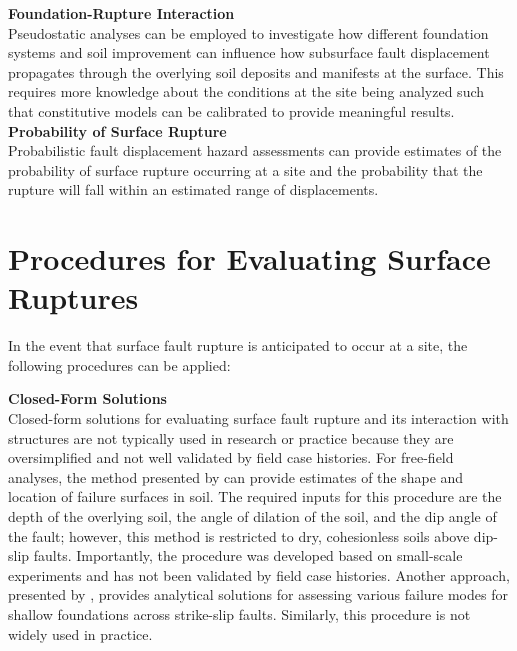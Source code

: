 \noindent\textbf{Foundation-Rupture Interaction}\\
Pseudostatic analyses can be employed to investigate how different foundation systems and soil improvement can influence how subsurface fault displacement propagates through the overlying soil deposits and manifests at the surface. This requires more knowledge about the conditions at the site being analyzed such that constitutive models can be calibrated to provide meaningful results.\\

\noindent\textbf{Probability of Surface Rupture}\\
Probabilistic fault displacement hazard assessments can provide estimates of the probability of surface rupture occurring at a site and the probability that the rupture will fall within an estimated range of displacements.\\

\section{Procedures for Evaluating Surface Ruptures}
\label{sec:eq_surface_rup_procedures}

In the event that surface fault rupture is anticipated to occur at a site, the following procedures can be applied:
\newline

\noindent\textbf{Closed-Form Solutions} \\
Closed-form solutions for evaluating surface fault rupture and its interaction with structures are not typically used in research or practice because they are oversimplified and not well validated by field case histories. For free-field analyses, the method presented by \cite{cole1984influence} can provide estimates of the shape and location of failure surfaces in soil. The required inputs for this procedure are the depth of the overlying soil, the angle of dilation of the soil, and the dip angle of the fault; however, this method is restricted to dry, cohesionless soils above dip-slip faults.  Importantly, the procedure was developed based on small-scale experiments and has not been validated by field case histories. Another approach, presented by \cite{berrill1983twodimensional}, provides analytical solutions for assessing various failure modes for shallow foundations across strike-slip faults. Similarly, this procedure is not widely used in practice.
\newline

